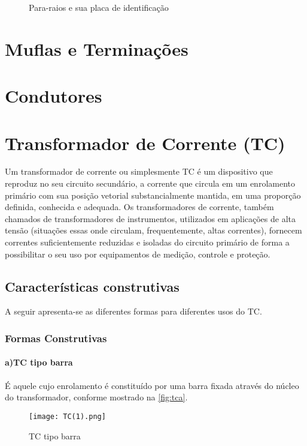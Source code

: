 		\begin{figure}[htb]
			\caption{Para-raios e sua placa de identificação}
			\centering
		\end{figure}

	\section{Muflas e Terminações}

	\section{Condutores}

	\section{Transformador de Corrente (TC)}
		Um transformador de corrente ou simplesmente TC é um dispositivo que reproduz no seu circuito secundário, a corrente que circula em um enrolamento primário com sua posição vetorial substancialmente mantida, em uma proporção definida, conhecida e adequada. Os transformadores de corrente, também chamados de transformadores de instrumentos, utilizados em aplicações de alta tensão (situações essas onde circulam, frequentemente, altas correntes), fornecem correntes suficientemente reduzidas e isoladas do circuito primário de forma a possibilitar o seu uso por equipamentos de medição, controle e proteção.\cite{mamedemanual}

		\subsection{Características construtivas}
			A seguir apresenta-se as diferentes formas para diferentes usos do TC.

			\subsubsection{Formas Construtivas}
				\paragraph*{a)\indent TC tipo barra}
					É aquele cujo enrolamento é constituído por uma barra fixada através do núcleo do transformador, conforme mostrado na \autoref{fig:tca}.
					\begin{figure}[htb]
						\caption{TC tipo barra}
						\centering
						\texttt{[image: TC(1).png]}
						\label{fig:tca}
					\end{figure}
